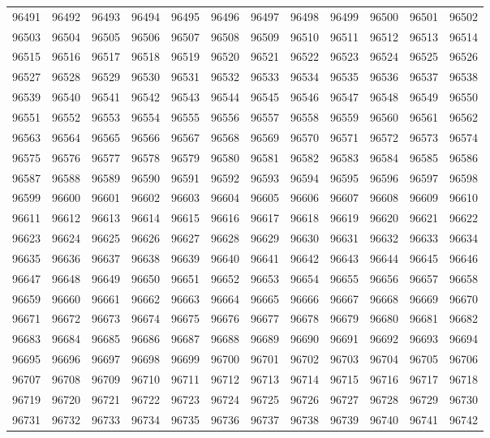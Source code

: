 \begin{center}
\begin{longtable}{llllllllllll}
96491 &96492 &96493 &96494 &96495 &96496 &96497 &96498 &96499 &96500 &96501 &96502 \\
96503 &96504 &96505 &96506 &96507 &96508 &96509 &96510 &96511 &96512 &96513 &96514 \\
96515 &96516 &96517 &96518 &96519 &96520 &96521 &96522 &96523 &96524 &96525 &96526 \\
96527 &96528 &96529 &96530 &96531 &96532 &96533 &96534 &96535 &96536 &96537 &96538 \\
96539 &96540 &96541 &96542 &96543 &96544 &96545 &96546 &96547 &96548 &96549 &96550 \\
96551 &96552 &96553 &96554 &96555 &96556 &96557 &96558 &96559 &96560 &96561 &96562 \\
96563 &96564 &96565 &96566 &96567 &96568 &96569 &96570 &96571 &96572 &96573 &96574 \\
96575 &96576 &96577 &96578 &96579 &96580 &96581 &96582 &96583 &96584 &96585 &96586 \\
96587 &96588 &96589 &96590 &96591 &96592 &96593 &96594 &96595 &96596 &96597 &96598 \\
96599 &96600 &96601 &96602 &96603 &96604 &96605 &96606 &96607 &96608 &96609 &96610 \\
96611 &96612 &96613 &96614 &96615 &96616 &96617 &96618 &96619 &96620 &96621 &96622 \\
96623 &96624 &96625 &96626 &96627 &96628 &96629 &96630 &96631 &96632 &96633 &96634 \\
96635 &96636 &96637 &96638 &96639 &96640 &96641 &96642 &96643 &96644 &96645 &96646 \\
96647 &96648 &96649 &96650 &96651 &96652 &96653 &96654 &96655 &96656 &96657 &96658 \\
96659 &96660 &96661 &96662 &96663 &96664 &96665 &96666 &96667 &96668 &96669 &96670 \\
96671 &96672 &96673 &96674 &96675 &96676 &96677 &96678 &96679 &96680 &96681 &96682 \\
96683 &96684 &96685 &96686 &96687 &96688 &96689 &96690 &96691 &96692 &96693 &96694 \\
96695 &96696 &96697 &96698 &96699 &96700 &96701 &96702 &96703 &96704 &96705 &96706 \\
96707 &96708 &96709 &96710 &96711 &96712 &96713 &96714 &96715 &96716 &96717 &96718 \\
96719 &96720 &96721 &96722 &96723 &96724 &96725 &96726 &96727 &96728 &96729 &96730 \\
96731 &96732 &96733 &96734 &96735 &96736 &96737 &96738 &96739 &96740 &96741 &96742 \\

\end{longtable}
\end{center}
